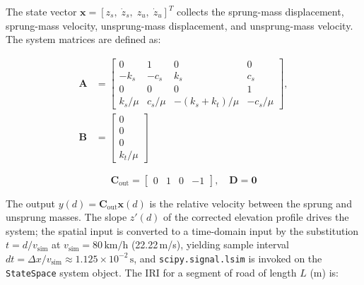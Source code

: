 \documentclass[conference]{IEEEtran}
\begin{document}
\begin{table}[htbp]
\centering
\caption{Canonical Quarter-Car (Golden Car) Parameters}
\label{tab:qc_params}
\end{table}

The state vector $\mathbf{x} = [z_s,\; \dot{z}_s,\; z_u,\; \dot{z}_u]^T$ collects the sprung-mass displacement, sprung-mass velocity, unsprung-mass displacement, and unsprung-mass velocity.
The system matrices are defined as:

\begin{equation}
\label{eq:qc_A}
\begin{split}
\mathbf{A} &= \begin{bmatrix} 0 & 1 & 0 & 0 \\ -k_s & -c_s & k_s & c_s \\ 0 & 0 & 0 & 1 \\ k_s/\mu & c_s/\mu & -(k_s+k_t)/\mu & -c_s/\mu \end{bmatrix}, \\
\mathbf{B} &= \begin{bmatrix} 0 \\ 0 \\ 0 \\ k_t/\mu \end{bmatrix}
\end{split}
\end{equation}

\begin{equation}
\label{eq:qc_C}
\mathbf{C}_{\text{out}} = \begin{bmatrix} 0 & 1 & 0 & -1 \end{bmatrix}, \quad \mathbf{D} = \mathbf{0}
\end{equation}

The output $y(d) = \mathbf{C}_{\text{out}} \mathbf{x}(d)$ is the relative velocity between the sprung and unsprung masses.
The slope $z'(d)$ of the corrected elevation profile drives the system;
the spatial input is converted to a time-domain input by the substitution $t = d / v_{\text{sim}}$ at $v_{\text{sim}} = 80\,\text{km/h}$ (22.22\,m/s), yielding sample interval $dt = \Delta x / v_{\text{sim}} \approx 1.125 \times 10^{-2}\,\text{s}$, and \texttt{scipy.signal.lsim} is invoked on the \texttt{StateSpace} system object.
The IRI for a segment of road of length $L$ (m) is:
\end{document}
